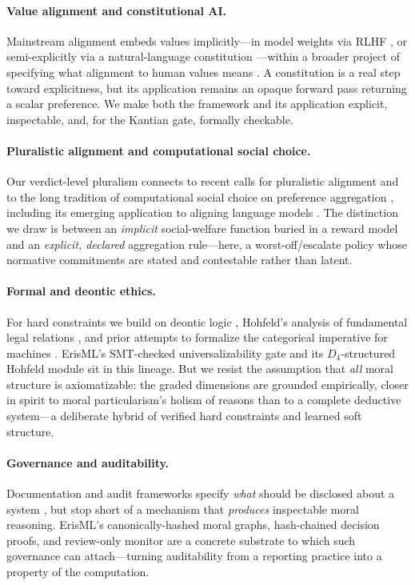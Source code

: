 \paragraph{Value alignment and constitutional AI.}
Mainstream alignment embeds values implicitly---in model weights via RLHF
\citep{christiano2017}, or semi-explicitly via a natural-language constitution
\citep{bai2022constitutional}---within a broader project of specifying what alignment to
human values means \citep{gabriel2020}. A constitution is a real step toward explicitness,
but its application remains an opaque forward pass returning a scalar preference. We make
both the framework and its application explicit, inspectable, and, for the Kantian gate,
formally checkable.

\paragraph{Pluralistic alignment and computational social choice.}
Our verdict-level pluralism connects to recent calls for pluralistic alignment
\citep{sorensen2024} and to the long tradition of computational social choice on preference
aggregation \citep{brandt2016}, including its emerging application to aligning language
models \citep{conitzer2024}. The distinction we draw is between an \emph{implicit}
social-welfare function buried in a reward model and an \emph{explicit, declared}
aggregation rule---here, a worst-off/escalate policy whose normative commitments are stated
and contestable rather than latent.

\paragraph{Formal and deontic ethics.}
For hard constraints we build on deontic logic \citep{vonwright1951,horty2001}, Hohfeld's
analysis of fundamental legal relations \citep{hohfeld1917}, and prior attempts to formalize
the categorical imperative for machines \citep{powers2006,lindner2019}. ErisML's SMT-checked
universalizability gate and its $D_4$-structured Hohfeld module sit in this lineage. But we
resist the assumption that \emph{all} moral structure is axiomatizable: the graded
dimensions are grounded empirically, closer in spirit to moral particularism's holism of
reasons \citep{dancy2004} than to a complete deductive system---a deliberate hybrid of
verified hard constraints and learned soft structure.

\paragraph{Governance and auditability.}
Documentation and audit frameworks specify \emph{what} should be disclosed about a system
\citep{mitchell2019,raji2020,nist2023}, but stop short of a mechanism that \emph{produces}
inspectable moral reasoning. ErisML's canonically-hashed moral graphs, hash-chained decision
proofs, and review-only monitor are a concrete substrate to which such governance can
attach---turning auditability from a reporting practice into a property of the computation.

